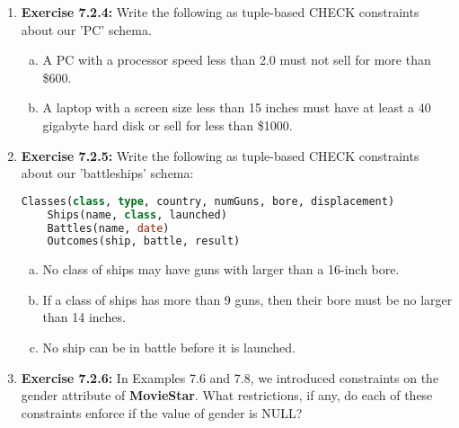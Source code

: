 \documentclass[12pt]{article}
\begin{document}
\begin{enumerate}[1.]
    \item \textbf{Exercise 7.2.4:} Write the following as tuple-based CHECK constraints about
    our 'PC' schema.

    \bigskip

    \begin{enumerate}[a)]
        \item A PC with a processor speed less than 2.0 must not sell for more than \$600.
        \item A laptop with a screen size less than 15 inches must have at least a 40 gigabyte hard disk or sell for less than \$1000.
    \end{enumerate}

    \item \textbf{Exercise 7.2.5:} Write the following as tuple-based CHECK constraints about
    our 'battleships' schema:

    \bigskip

    \begin{lstlisting}[language=SQL]
    Classes(class, type, country, numGuns, bore, displacement)
    Ships(name, class, launched)
    Battles(name, date)
    Outcomes(ship, battle, result)
    \end{lstlisting}

    \begin{enumerate}[a)]
        \item No class of ships may have guns with larger than a 16-inch bore.
        \item If a class of ships has more than 9 guns, then their bore must be no larger than 14 inches.
        \item No ship can be in battle before it is launched.
    \end{enumerate}

    \item \textbf{Exercise 7.2.6:} In Examples 7.6 and 7.8, we introduced constraints on the
    gender attribute of \textbf{MovieStar}. What restrictions, if any, do each of these constraints
    enforce if the value of gender is NULL?

\end{enumerate}
\end{document}
